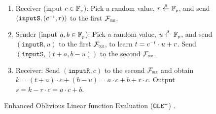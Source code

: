 \begin{figure}[ht]
\setlength{\fboxsep}{1pt}
\begin{center}
\begin{boxedminipage}{8.5cm}
\begin{small}
\begin{enumerate}[leftmargin=5.5mm]
%
\item  Receiver (input $c \in \mathbb{F}_{\scriptscriptstyle p} $): Pick a random value, $r\stackrel{\scriptscriptstyle\$}\leftarrow  \mathbb{F}_{\scriptscriptstyle p} $, and send  $(\mathtt{inputS}, (c^{\scriptscriptstyle -1}, r))$ to the first $\mathcal{F}_{\scriptscriptstyle\mathtt{OLE}}$.
%
%
\item Sender (input $a, b \in \mathbb{F}_{\scriptscriptstyle p} $): Pick a random value, $u \stackrel{\scriptscriptstyle\$}\leftarrow  \mathbb{F}_{\scriptscriptstyle p} $, and send $(\mathtt{inputR}, u)$ to the first $\mathcal{F}_{\scriptscriptstyle\mathtt{OLE}}$, to learn $t =  c^{\scriptscriptstyle -1}\cdot u
 + r$. Send $(\mathtt{inputS},(t + a, b - u))$ to the second $\mathcal{F}_{\scriptscriptstyle\mathtt{OLE}}$.
%
\item Receiver: Send $(\mathtt{inputR}, c)$ to the second $\mathcal{F}_{\scriptscriptstyle\mathtt{OLE}}$ and obtain $k = (t+a)\cdot c+(b-u)=a\cdot c + b + r\cdot c$. Output $s=k - r\cdot c=a\cdot c + b$.

\end{enumerate}
\end{small}
\end{boxedminipage}
\end{center}
 \vspace{-2mm}
\caption{
\small {Enhanced Oblivious Linear function Evaluation  ($\mathtt{OLE}^{\scriptscriptstyle +}$)  \cite{GhoshN19}}.} 
\label{fig:OLE-plus-protocol}
 \vspace{-2mm}
\end{figure}
